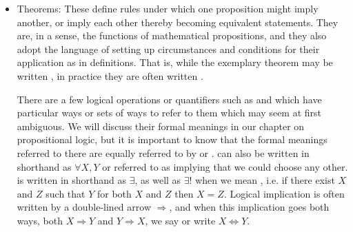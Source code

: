 \documentclass[11pt]{article}
\begin{document}
\begin{itemize}
    \item Theorems: These define rules under which one proposition might imply another, or imply each other thereby becoming equivalent statements. They are, in a sense, the functions of mathematical propositions, and they also adopt the language of setting up circumstances and conditions for their application as in definitions. That is, while the exemplary theorem may be written , in practice they are often written .

    There are a few logical operations or quantifiers such as  and  which have particular ways or sets of ways to refer to them which may seem at first ambiguous. We will discuss their formal meanings in our chapter on propositional logic, but it is important to know that the formal meanings referred to there are equally referred to by  or .  can also be written in shorthand as $\forall X, Y$ or referred to as  implying that we could choose any other.  is written in shorthand as $\exists$, as well as $\exists !$ when we mean , i.e. if there exist $X$ and $Z$ such that $Y$ for both $X$ and $Z$ then $X = Z$. Logical implication is often written by a double-lined arrow $\Rightarrow$, and when this implication goes both ways, both $X \Rightarrow Y$ and $Y \Rightarrow X$, we say  or write $X \Leftrightarrow Y$.


\end{itemize}
\end{document}
